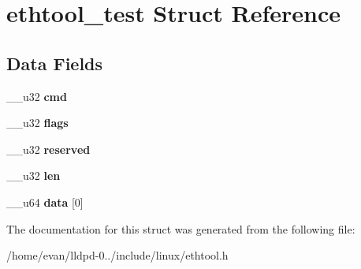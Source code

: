 \section{ethtool\-\_\-test \-Struct \-Reference}
\label{structethtool__test}
\subsection*{\-Data \-Fields}
\begin{DoxyCompactItemize}
\item 
\-\_\-\-\_\-u32 {\bfseries cmd}\label{structethtool__test_a66d231264d5aa36fd7d347e2c967769a}

\item 
\-\_\-\-\_\-u32 {\bfseries flags}\label{structethtool__test_a04a0bd666e371f3fab92b8d0ef5dbdb0}

\item 
\-\_\-\-\_\-u32 {\bfseries reserved}\label{structethtool__test_a6119e2b7a1d60ee775526a7386af84f2}

\item 
\-\_\-\-\_\-u32 {\bfseries len}\label{structethtool__test_a6727c6c5c16cc9c9786bfbfd3f30f9a1}

\item 
\-\_\-\-\_\-u64 {\bfseries data} [0]\label{structethtool__test_a7852bf7679a05e9065b7b7ccc905bc45}

\end{DoxyCompactItemize}


\-The documentation for this struct was generated from the following file\-:\begin{DoxyCompactItemize}
\item 
/home/evan/lldpd-\/0../include/linux/ethtool.\-h\end{DoxyCompactItemize}
